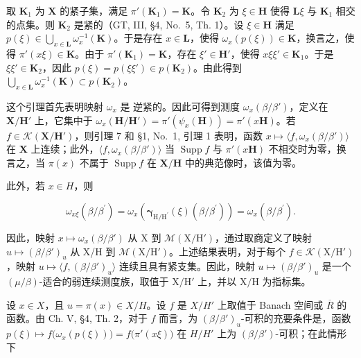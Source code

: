 取 \(\mathbf{K}_1\) 为 \(\mathbf{X}\) 的紧子集，满足 \(\pi'(\mathbf{K}_1) = \mathbf{K}\)。令 \(\mathbf{K}_2\) 为 \(\xi \in \mathbf{H}\) 使得 \(\mathbf{L}\xi\) 与 \(\mathbf{K}_1\) 相交的点集。则 \(\mathbf{K}_2\) 是紧的（GT, III, §4, No.~5, Th. 1）。设 \(\xi \in \mathbf{H}\) 满足 \(p(\xi) \in \bigcup_{x \in \mathbf{L}} \omega_x^{-1}(\mathbf{K})\)。于是存在 \(x \in \mathbf{L}\)，使得 \(\omega_x(p(\xi)) \in \mathbf{K}\)，换言之，使得 \(\pi'(x\xi) \in \mathbf{K}\)。由于 \(\pi'(\mathbf{K}_1) = \mathbf{K}\)，存在 \(\xi' \in \mathbf{H}'\)，使得 \(x\xi\xi' \in \mathbf{K}_1\)。于是 \(\xi\xi' \in \mathbf{K}_2\)，因此 \(p(\xi) = p(\xi\xi') \in p(\mathbf{K}_2)\)。由此得到 \(\bigcup_{x \in \mathbf{L}} \omega_x^{-1}(\mathbf{K}) \subset p(\mathbf{K}_2)\)。

这个引理首先表明映射 \(\omega_x\) 是 逆紧的。因此可得到测度 \(\omega_x(\beta/\beta')\)，定义在 \(\mathbf{X}/\mathbf{H}'\) 上，它集中于 \(\omega_x(\mathbf{H}/\mathbf{H}') = \pi'(\psi_x(\mathbf{H})) = \pi'(x\mathbf{H})\)。若 \(f \in \mathcal{K}(\mathbf{X}/\mathbf{H}')\)，则引理 7 和 §1, No.~1, 引理 1 表明，函数 \(x \mapsto \langle f, \omega_x(\beta/\beta') \rangle\) 在 \(\mathbf{X}\) 上连续；此外，\(\langle f, \omega_x(\beta/\beta') \rangle\) 当 \(\operatorname{Supp} f\) 与 \(\pi'(x\mathbf{H})\) 不相交时为零，换言之，当 \(\pi(x)\) 不属于 \(\operatorname{Supp} f\) 在 \(\mathbf{X}/\mathbf{H}\) 中的典范像时，该值为零。

此外，若 \(x \in H\)，则

\[
\omega_ {x \xi} (\beta / \beta^ {\prime}) = \omega_ {x} \left(\boldsymbol {\gamma} _ {\mathrm{H} / \mathrm{H} ^ {\prime}} (\xi) (\beta / \beta^ {\prime})\right) = \omega_ {x} (\beta / \beta^ {\prime}).
\]

因此，映射 \(x \mapsto \omega_x(\beta/\beta')\) 从 X 到 \(\mathcal{M}(\mathrm{X}/\mathrm{H}')\)，通过取商定义了映射 \(u \mapsto (\beta/\beta')_u\) 从 X/H 到 \(\mathcal{M}(\mathrm{X}/\mathrm{H}')\)。上述结果表明，对于每个 \(f \in \mathcal{K}(\mathrm{X}/\mathrm{H}')\)，映射 \(u \mapsto \langle f, (\beta/\beta')_u \rangle\) 连续且具有紧支集。因此，映射 \(u \mapsto (\beta/\beta')_u\) 是一个 \((\mu/\beta)\)-适合的弱连续测度族，取值于 \(\mathrm{X}/\mathrm{H}'\) 上，并以 \(\mathrm{X}/\mathrm{H}\) 为指标集。

设 \(x \in X\)，且 \(u = \pi(x) \in X/H\)。设 \(f\) 是 \(X/H'\) 上取值于 Banach 空间或 \(\overline{R}\) 的函数。由 Ch. V, §4, Th. 2，对于 \(f\) 而言，为 \((\beta/\beta')_u\)-可积的充要条件是，函数 \(p(\xi) \mapsto f\big(\omega_x(p(\xi))\big) = f\big(\pi'(x\xi)\big)\) 在 \(H/H'\) 上为 \((\beta/\beta')\)-可积；在此情形下

